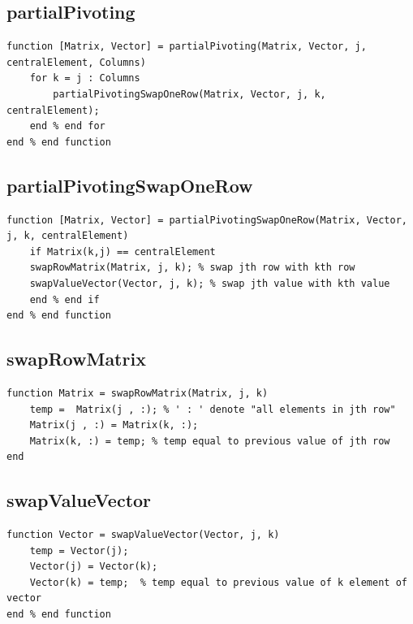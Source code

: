 \subsection{partialPivoting}
\begin{simplechar}
\begin{lstlisting}
function [Matrix, Vector] = partialPivoting(Matrix, Vector, j, centralElement, Columns)
    for k = j : Columns
        partialPivotingSwapOneRow(Matrix, Vector, j, k, centralElement);
    end % end for
end % end function
\end{lstlisting}
\end{simplechar}

\newpage
\subsection{partialPivotingSwapOneRow}
\begin{simplechar}
\begin{lstlisting}
function [Matrix, Vector] = partialPivotingSwapOneRow(Matrix, Vector, j, k, centralElement)
    if Matrix(k,j) == centralElement
    swapRowMatrix(Matrix, j, k); % swap jth row with kth row
    swapValueVector(Vector, j, k); % swap jth value with kth value
    end % end if
end % end function
\end{lstlisting}
\end{simplechar}


\subsection{swapRowMatrix}
\begin{simplechar}
\begin{lstlisting}
function Matrix = swapRowMatrix(Matrix, j, k)
    temp =  Matrix(j , :); % ' : ' denote "all elements in jth row"
    Matrix(j , :) = Matrix(k, :);
    Matrix(k, :) = temp; % temp equal to previous value of jth row
end
\end{lstlisting}
\end{simplechar}

\subsection{swapValueVector}
\begin{simplechar}
\begin{lstlisting}
function Vector = swapValueVector(Vector, j, k)
    temp = Vector(j);
    Vector(j) = Vector(k);
    Vector(k) = temp;  % temp equal to previous value of k element of vector
end % end function
\end{lstlisting}
\end{simplechar}


